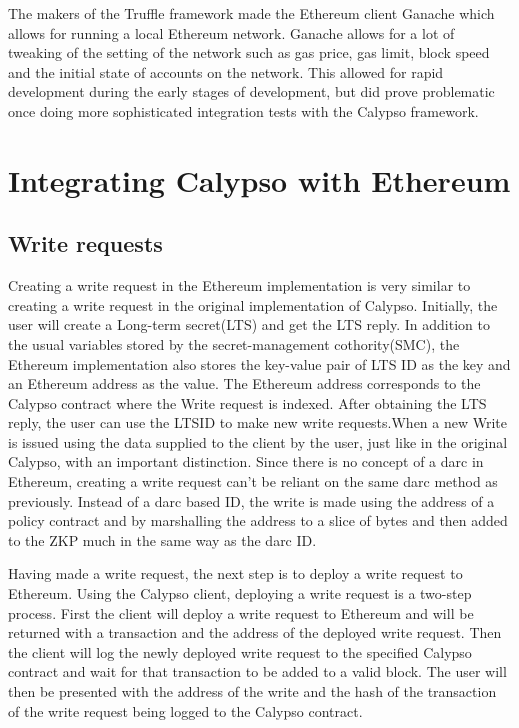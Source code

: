 \documentclass[12pt]{article}
\begin{document}
The makers of the Truffle framework made the Ethereum client Ganache which allows for running a local Ethereum network. Ganache allows for a lot of tweaking of the setting of the network such as gas price, gas limit, block speed and the initial state of accounts on the network. This allowed for rapid development during the early stages of development, but did prove problematic once doing more sophisticated integration tests with the Calypso framework.


\section{Integrating Calypso with Ethereum}
\subsection{Write requests}
Creating a write request in the Ethereum implementation is very similar to creating a write request in the original implementation of Calypso. Initially, the user will create a Long-term secret(LTS) and get the LTS reply. In addition to the usual variables stored by the secret-management cothority(SMC), the Ethereum implementation also stores the key-value pair of LTS ID as the key and an Ethereum address as the value. The Ethereum address corresponds to the Calypso contract where the Write request is indexed. After obtaining the LTS reply, the user can use the LTSID to make new write requests.When a new Write is issued using the data supplied to the client by the user, just like in the original Calypso, with an important distinction. Since there is no concept of a darc in Ethereum, creating a write request can’t be reliant on the same darc method as previously. Instead of a darc based ID, the write is made using the address of a policy contract and by marshalling the address to a slice of bytes and then added to the ZKP much in the same way as the darc ID. 

Having made a write request, the next step is to deploy a write request to Ethereum. Using the Calypso client, deploying a write request is a two-step process. First the client will deploy a write request to Ethereum and will be returned with a transaction and the address of the deployed write request. Then the client will log the newly deployed write request to the specified Calypso contract and wait for that transaction to be added to a valid block. The user will then be presented with the address of the write and the hash of the transaction of  the write request being logged to the Calypso contract.
\end{document}
